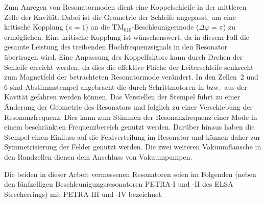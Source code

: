 Zum Anregen von Resonatormoden dient eine Koppelschleife \cite{desy_schleife} in der mittleren Zelle der Kavität.
Dabei ist die Geometrie der Schleife angepasst, um eine kritische Kopplung ($\kappa = 1$) an die $\mathrm{TM}_{010}$-Beschleuniger\-mode ($\Delta \varphi = \pi$) zu ermöglichen.
Eine kritische Kopplung ist wünschenswert, da in diesem Fall die gesamte Leistung des treibenden Hochfrequenzsignals in den Resonator übertragen wird.
Eine Anpassung des Koppelfaktors kann durch Drehen der Schleife erreicht werden, da dies die effektive Fläche der Leiterschleife senkrecht zum Magnetfeld der betrachteten Resonatormode verändert.
In den Zellen~2 und 6 sind Abstimmstempel \cite{desy_stempel} angebracht die durch Schrittmotoren in bzw.\ aus der Kavität gefahren werden können.
Das Verstellen der Stempel führt zu einer Änderung der Geometrie des Resonators und folglich zu einer Verschiebung der Resonanzfrequenz.
Dies kann zum Stimmen der Resonanzfrequenz einer Mode in einem beschränkten Frequenzbereich genutzt werden.
Darüber hinaus haben die Stempel einen Einfluss auf die Feldverteilung im Resonator und können daher zur Symmetrisierung der Felder genutzt werden.
Die zwei weiteren Vakuumflansche in den Randzellen dienen dem Anschluss von Vakuumpumpen.

Die beiden in dieser Arbeit vermessenen Resonatoren seien im Folgenden (neben den fünfzelligen Beschleunigungsresonatoren PETRA-I und -II des ELSA Strecherrings) mit PETRA-III und -IV bezeichnet.


